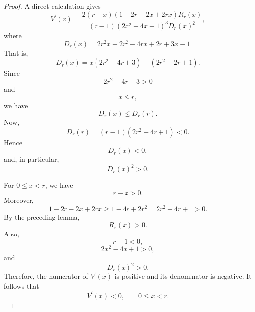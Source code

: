 \documentclass[11pt,a4paper]{article}
\numberwithin{equation}{section}
\numberwithin{table}{section}
\theoremstyle{plain}
\theoremstyle{definition}\newtheorem{definition}[theorem]{Definition}
\theoremstyle{remark}\newtheorem{remark}[theorem]{Remark}
\begin{document}
\begin{proof}
A direct calculation gives 
\begin{equation*}
V^{\prime}(x)=\frac{2(r-x)(1-2r-2x+2rx)R_r(x)}{(r-1)(2x^2-4x+1)^3D_r(x)^2},
\end{equation*}
where 
\begin{equation*}
D_r(x)=2r^2x-2r^2-4rx+2r+3x-1.
\end{equation*}
That is, 
\begin{equation*}
D_r(x)=x(2r^2-4r+3)-(2r^2-2r+1).
\end{equation*}
Since 
\begin{equation*}
2r^2-4r+3>0
\end{equation*}
and 
\begin{equation*}
x\leq r,
\end{equation*}
we have 
\begin{equation*}
D_r(x)\leq D_r(r).
\end{equation*}
Now, 
\begin{equation*}
D_r(r)=(r-1)(2r^2-4r+1)<0.
\end{equation*}
Hence 
\begin{equation*}
D_r(x)<0,
\end{equation*}
and, in particular, 
\begin{equation*}
D_r(x)^2>0.
\end{equation*}

For $0\leq x<r$, we have 
\begin{equation*}
r-x>0.
\end{equation*}
Moreover, 
\begin{equation*}
1-2r-2x+2rx\geq1-4r+2r^2=2r^2-4r+1>0.
\end{equation*}
By the preceding lemma, 
\begin{equation*}
R_r(x)>0.
\end{equation*}
Also, 
\begin{equation*}
r-1<0,
\end{equation*}
\begin{equation*}
2x^2-4x+1>0,
\end{equation*}
and 
\begin{equation*}
D_r(x)^2>0.
\end{equation*}
Therefore, the numerator of $V^{\prime}(x)$ is positive and its
denominator is negative. It follows that 
\begin{equation*}
V^{\prime}(x)<0, \qquad 0\leq x<r.
\end{equation*}
\end{proof}
\end{document}
